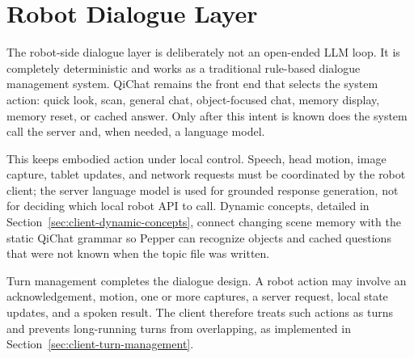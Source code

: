 \section{Robot Dialogue Layer}\label{sec:architecture-dialogue-layer}

The robot-side dialogue layer is deliberately not an open-ended LLM loop. It is completely deterministic and works as a traditional rule-based dialogue management system.
QiChat remains the front end that selects the system action: quick look, scan, general chat, object-focused chat, memory display, memory reset, or cached answer.
Only after this intent is known does the system call the server and, when needed, a language model.

This keeps embodied action under local control.
Speech, head motion, image capture, tablet updates, and network requests must be coordinated by the robot client; the server language model is used for grounded response generation, not for deciding which local robot API to call.
Dynamic concepts, detailed in Section~\ref{sec:client-dynamic-concepts}, connect changing scene memory with the static QiChat grammar so Pepper can recognize objects and cached questions that were not known when the topic file was written.

Turn management completes the dialogue design.
A robot action may involve an acknowledgement, motion, one or more captures, a server request, local state updates, and a spoken result.
The client therefore treats such actions as turns and prevents long-running turns from overlapping, as implemented in Section~\ref{sec:client-turn-management}.



